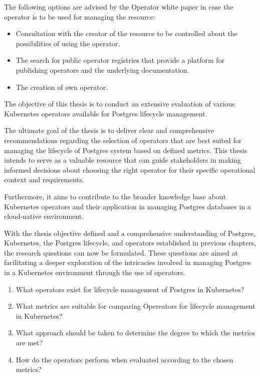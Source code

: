 The following options are advised by the Operator white paper \cite{operatorWhitepaper} in case the operator is to be used for managing the resource:
\begin{itemize}
    \item	Consultation with the creator of the resource to be controlled about the possibilities of using the operator.
    \item	The search for public operator registries that provide a platform for publishing operators and the underlying documentation.
    \item	The creation of own operator.
\end{itemize}

\label{chap:objectives}
The objective of this thesis is to conduct an extensive evaluation of various Kubernetes operators available for Postgres lifecycle management.

The ultimate goal of the thesis is to deliver clear and comprehensive recommendations regarding the selection of operators that are best suited for managing the lifecycle of Postgres system based on defined metrics. This thesis intends to serve as a valuable resource that can guide stakeholders in making informed decisions about choosing the right operator for their specific operational context and requirements.

Furthermore, it aims to contribute to the broader knowledge base about Kubernetes operators and their application in managing Postgres databases in a cloud-native environment.


\label{chap:resourceQuestions}
With the thesis objective defined and a comprehensive understanding of Postgres, Kubernetes, the Postgres lifecycle, and operators established in previous chapters, the research questions can now be formulated.
These questions are aimed at facilitating a deeper exploration of the intricacies involved in managing Postgres in a Kubernetes environment through the use of operators.

\begin{enumerate}
    \item What operators exist for lifecycle management of Postgres in Kubernetes?
    \item What metrics are suitable for comparing Opereators for lifecycle management in Kubernetes?
    \item What approach should be taken to determine the degree to which the metrics are met?
    \item How do the operators perform when evaluated according to the chosen metrics?
\end{enumerate}

